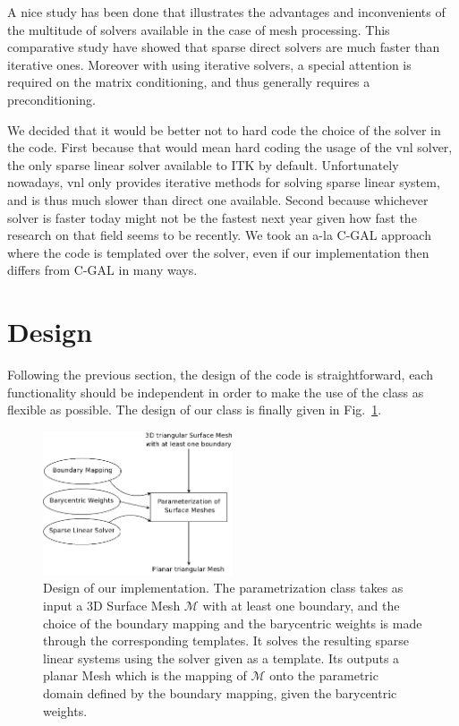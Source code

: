 \documentclass{InsightArticle}
\def \Mesh {\mathcal{M}}
\begin{document}
A nice study has been done \cite{Kobbelt05} that illustrates the advantages and inconvenients of the multitude of solvers available in the case of mesh processing. This comparative study have showed that sparse direct solvers are much faster than iterative ones. Moreover with using iterative solvers, a special attention is required on the matrix conditioning, and thus generally requires a preconditioning.

We decided that it would be better not to hard code the choice of the solver in the code. First because that would mean hard coding the usage of the vnl solver, the only sparse linear solver available to ITK by default. Unfortunately nowadays, vnl only provides iterative methods for solving sparse linear system, and is thus much slower than direct one available. Second because whichever solver is faster today might not be the fastest next year given how fast the research on that field seems to be recently. We took an a-la C-GAL approach where the code is templated over the solver, even if our implementation then differs from C-GAL in many ways.

\section{Design}

Following the previous section, the design of the code is straightforward, each functionality should be independent in order to make the use of the class as flexible as possible. The design of our class is finally given in Fig.~\ref{fig:class_design}.

\begin{figure}[htbp]
    \centering
\includegraphics[width=0.5\textwidth]{Diagram1}
\caption{Design of our implementation. The parametrization class takes as input a $3$D Surface Mesh $\Mesh$ with at least one boundary, and the choice of the boundary mapping and the barycentric weights is made through the corresponding templates. It solves the resulting sparse linear systems using the solver given as a template. Its outputs a planar Mesh which is the mapping of $\Mesh$ onto the parametric domain defined by the boundary mapping, given the barycentric weights.}\label{fig:class_design}
\end{figure}
\end{document}
